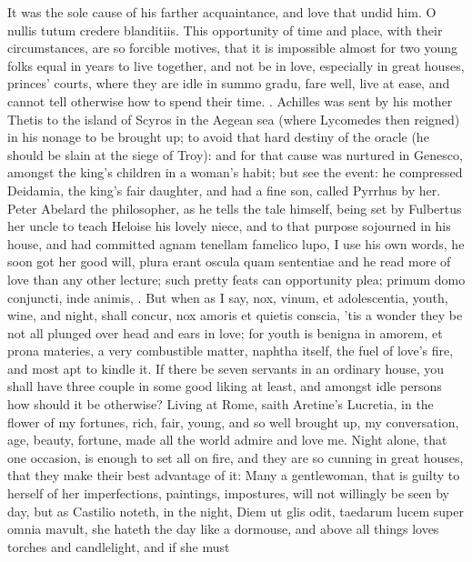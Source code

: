 It was the sole cause of his farther acquaintance, and love that undid
him. O nullis tutum credere blanditiis.
This opportunity of time and place, with their circumstances, are so
forcible motives, that it is impossible almost for two young folks
equal in years to live together, and not be in love, especially in
great houses, princes' courts, where they are idle in summo gradu, fare
well, live at ease, and cannot tell otherwise how to spend their time.
. Achilles was sent by his
mother Thetis to the island of Scyros in the Aegean sea (where
Lycomedes then reigned) in his nonage to be brought up; to avoid that
hard destiny of the oracle (he should be slain at the siege of Troy):
and for that cause was nurtured in Genesco, amongst the king's children
in a woman's habit; but see the event: he compressed Deidamia, the
king's fair daughter, and had a fine son, called Pyrrhus by her. Peter
Abelard the philosopher, as he tells the tale himself, being set by
Fulbertus her uncle to teach Heloise his lovely niece, and to that
purpose sojourned in his house, and had committed agnam tenellam
famelico lupo, I use his own words, he soon got her good will, plura
erant oscula quam sententiae and he read more of love than any other
lecture; such pretty feats can opportunity plea; primum domo conjuncti,
inde animis, \etc{}. But when as I say, nox, vinum, et adolescentia, youth,
wine, and night, shall concur, nox amoris et quietis conscia, 'tis a
wonder they be not all plunged over head and ears in love; for youth is
benigna in amorem, et prona materies, a very combustible matter,
naphtha itself, the fuel of love's fire, and most apt to kindle it. If
there be seven servants in an ordinary house, you shall have three
couple in some good liking at least, and amongst idle persons how
should it be otherwise? Living at Rome, saith Aretine's Lucretia,
in the flower of my fortunes, rich, fair, young, and so well brought
up, my conversation, age, beauty, fortune, made all the world admire
and love me. Night alone, that one occasion, is enough to set all on
fire, and they are so cunning in great houses, that they make their
best advantage of it: Many a gentlewoman, that is guilty to herself of
her imperfections, paintings, impostures, will not willingly be seen by
day, but as Castilio noteth, in the night, Diem ut glis odit,
taedarum lucem super omnia mavult, she hateth the day like a dormouse,
and above all things loves torches and candlelight, and if she must
